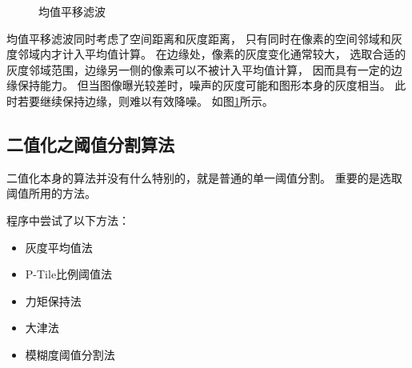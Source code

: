 \documentclass[12pt,a4paper]{article}
\begin{document}
\begin{figure}[!htb]
    \centering
    \hfill
    \caption{均值平移滤波}\label{fig:meanshift}
\end{figure}

均值平移滤波\cite{MeanShiftWiki}同时考虑了空间距离和灰度距离，
只有同时在像素的空间邻域和灰度邻域内才计入平均值计算。
在边缘处，像素的灰度变化通常较大，
选取合适的灰度邻域范围，边缘另一侧的像素可以不被计入平均值计算，
因而具有一定的边缘保持能力。
但当图像曝光较差时，噪声的灰度可能和图形本身的灰度相当。
此时若要继续保持边缘，则难以有效降噪。
如图\ref{fig:meanshift}所示。

\subsection{二值化之阈值分割算法}

二值化本身的算法并没有什么特别的，就是普通的单一阈值分割。
重要的是选取阈值所用的方法。

程序中尝试了以下方法：
\begin{itemize}
    \item 灰度平均值法
    \item P-Tile比例阈值法
    \item 力矩保持法\cite{Tsai1985Moment}
    \item 大津法\cite{Otsu1979A}
    \item 模糊度阈值分割法\cite{Huang1995Image}
\end{itemize}
\end{document}
